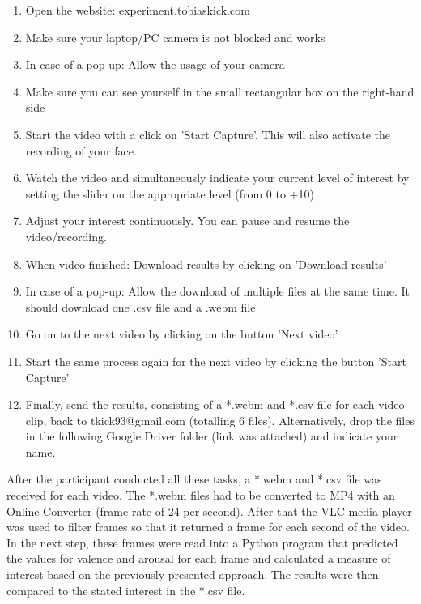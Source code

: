\begin{enumerate}[noitemsep]
    \item Open the website: experiment.tobiaskick.com
    \item Make sure your laptop/PC camera is not blocked and works
    \item In case of a pop-up: Allow the usage of your camera
    \item Make sure you can see yourself in the small rectangular box on the right-hand side
    \item Start the video with a click on 'Start Capture'. This will also activate the recording of your face.
    \item Watch the video and simultaneously indicate your current level of interest by setting the slider on the appropriate level (from 0 to +10)
    \item Adjust your interest continuously. You can pause and resume the video/recording.
    \item When video finished: Download results by clicking on 'Download results'
    \item In case of a pop-up: Allow the download of multiple files at the same time. It should download one .csv file and a .webm file
    \item Go on to the next video by clicking on the button 'Next video'
    \item Start the same process again for the next video by clicking the button 'Start Capture'
    \item Finally, send the results, consisting of a *.webm and *.csv file for each video clip, back to tkick93@gmail.com (totalling 6 files). Alternatively, drop the files in the following Google Driver folder (link was attached) and indicate your name.
\end{enumerate}

After the participant conducted all these tasks, a *.webm and *.csv file was received for each video. The *.webm files had to be converted to MP4 with an Online Converter (frame rate of 24 per second). After that the VLC media player was used to filter frames so that it returned a frame for each second of the video.
\newline\newline
In the next step, these frames were read into a Python program that predicted the values for valence and arousal for each frame and calculated a measure of interest based on the previously presented approach. The results were then compared to the stated interest in the *.csv file.


